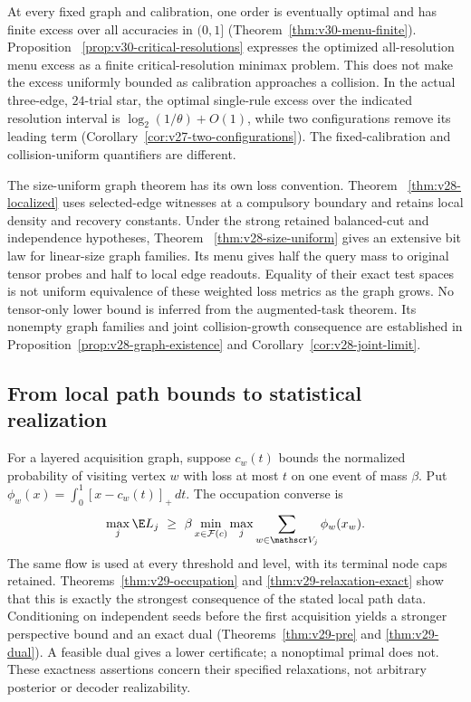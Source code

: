 At every fixed graph and calibration, one order is eventually optimal
and has finite excess over all accuracies in $(0,1]$
(Theorem~\ref{thm:v30-menu-finite}). Proposition~
\ref{prop:v30-critical-resolutions} expresses the optimized all-resolution
menu excess as a finite critical-resolution minimax problem. This does
not make the excess uniformly bounded as calibration approaches a
collision. In the actual three-edge, $24$-trial star, the optimal
single-rule excess over the indicated resolution interval is
$\log_2(1/\theta)+O(1)$, while two configurations remove its leading
term (Corollary~\ref{cor:v27-two-configurations}). The fixed-calibration
and collision-uniform quantifiers are different.

The size-uniform graph theorem has its own loss convention. Theorem~
\ref{thm:v28-localized} uses selected-edge witnesses at a compulsory
boundary and retains local density and recovery constants. Under the
strong retained balanced-cut and independence hypotheses, Theorem~
\ref{thm:v28-size-uniform} gives an extensive bit law for linear-size
graph families. Its menu gives half the query mass to original tensor
probes and half to local edge readouts. Equality of their exact test
spaces is not uniform equivalence of these weighted loss metrics as
the graph grows. No tensor-only lower bound is inferred from the
augmented-task theorem. Its nonempty graph families and joint
collision-growth consequence are established in
Proposition~\ref{prop:v28-graph-existence} and
Corollary~\ref{cor:v28-joint-limit}.

\subsection{From local path bounds to statistical realization}
For a layered acquisition graph, suppose $c_w(t)$ bounds the normalized
probability of visiting vertex $w$ with loss at most $t$ on one event
of mass $\beta$. Put $\phi_w(x)=\int_0^1[x-c_w(t)]_+\,dt$.
The occupation converse is
\[
 \max_j\E L_j\ \ge\ \beta
    \min_{x\in\mathcal F(c)}\max_j
                   \sum_{w\in\mathscr V_j}\phi_w(x_w).
\]
The same flow is used at every threshold and level, with its terminal
node caps retained. Theorems~\ref{thm:v29-occupation} and
\ref{thm:v29-relaxation-exact} show that this is exactly the strongest
consequence of the stated local path data. Conditioning on independent
seeds before the first acquisition yields a stronger perspective bound
and an exact dual (Theorems~\ref{thm:v29-pre} and \ref{thm:v29-dual}).
A feasible dual gives a lower certificate; a nonoptimal primal does not.
These exactness assertions concern their specified relaxations, not
arbitrary posterior or decoder realizability.

